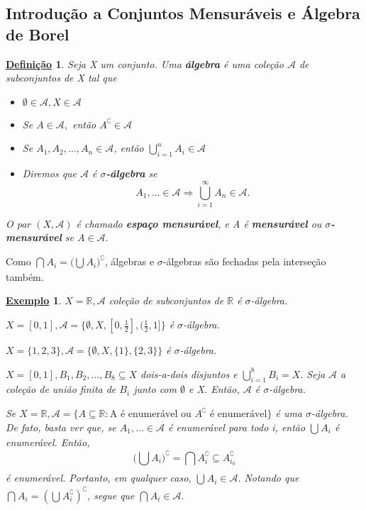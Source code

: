 \documentclass{article}
\newtheorem*{def*}{\underline{Defini\c c\~ao}}
\newtheorem{example}{\underline{Exemplo}}
\begin{document}
\subsection{Introdução a Conjuntos Mensuráveis e Álgebra de Borel}
\begin{def*}
	Seja X um conjunto. Uma \textbf{álgebra} é uma coleção \(\mathcal{A}\) de subconjuntos de X tal que
	\begin{itemize}
		\item[1)] \(\emptyset \in \mathcal{A}, X\in \mathcal{A}\)
		\item[2)] Se \(A\in \mathcal{A},\) então \(A ^{\complement}\in \mathcal{A}\)
		\item[3)] Se \(A_{1}, A_{2}, \dotsc , A_{n}\in \mathcal{A}\), então \(\bigcup_{i=1}^{n}A_{i}\in \mathcal{A}\)
		\item[4)] Diremos que \(\mathcal{A}\) é \textbf{\(\sigma \)-álgebra} se
		      \[
			      A_{1}, \dotsc \in \mathcal{A} \Rightarrow  \bigcup_{i=1}^{\infty}A_{n}\in \mathcal{A}.
		      \]
	\end{itemize}
	O par \((X, \mathcal{A})\) é chamado \textbf{espaço mensurável}, e A é \textbf{mensurável} ou \(\sigma \)\textbf{-mensurável} se \(A\in \mathcal{A}.\)
\end{def*}
Como \(\bigcap_{}^{}A_{i} = \biggl(\bigcup_{}^{}A_{i}\biggr) ^{\complement}\), álgebras e \(\sigma \)-álgebras são fechadas pela interseção também.
\begin{example}
	\item[1)] \(X = \mathbb{R}, \mathcal{A}\) coleção de subconjuntos de \(\mathbb{R}\) é \(\sigma \)-álgebra.
	\item[2)] \(X = [0, 1], \mathcal{A} = \{\emptyset , X, [0, \frac{1}{2}], (\frac{1}{2}, 1]\}\) é \(\sigma \)-álgebra.
	\item[3)] \(X = \{1, 2, 3\}, \mathcal{A} = \{\emptyset , X, \{1\}, \{2, 3\}\}\) é \(\sigma\)-álgebra.
	\item[4)] \(X = [0, 1], B_{1}, B_{2}, \dotsc , B_{8}\subseteq X\) dois-a-dois disjuntos e \(\bigcup_{i=1}^{8}B_{i} = X.\) Seja \(\mathcal{A}\) a coleção de
	união finita de \(B_{i}\) junto com \(\emptyset \) e X. Então, \(\mathcal{A}\) é \(\sigma \)-álgebra.
	\item[5)] Se \(X = \mathbb{R}, \mathcal{A} = \{A\subseteq \mathbb{R}: \text{A é enumerável ou }A ^{\complement} \text{ é enumerável}\} \) é uma \(\sigma \)-álgebra. De fato,
	basta ver que, se \(A_{1}, \dotsc \in \mathcal{A}\) é enumerável para todo i, então \(\bigcup_{}^{}A_{i}\) é enumerável. Então,
	\[
		\biggl(\bigcup_{}^{}A_{i}\biggr) ^{\complement} = \bigcap_{}^{}A_{i}^{\complement} \subseteq A_{i_{0}}^{\complement}
	\]
	é enumerável. Portanto, em qualquer caso, \(\bigcup_{}^{}A_{i}\in \mathcal{A}.\) Notando que \(\bigcap_{}^{}A_{i} = (\bigcup_{}^{}A_{i}^{\complement})^{\complement}\), segue que \(\bigcap_{}^{}A_{i}\in \mathcal{A}.\)
\end{example}
\end{document}

